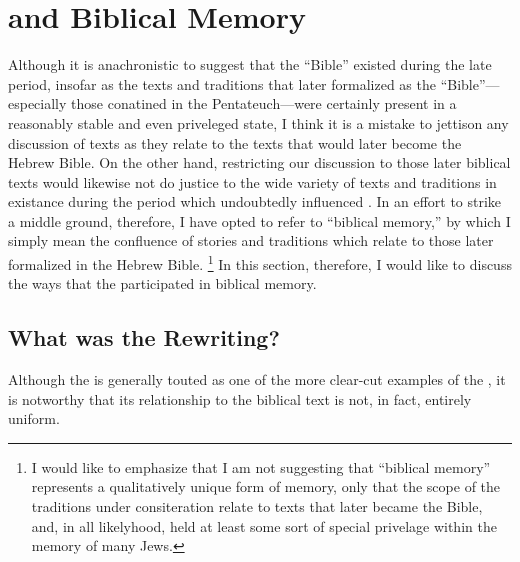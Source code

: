 




\section{\ga and Biblical Memory}

Although it is anachronistic to suggest that the ``Bible''  existed during the late \secondtemple period, insofar as the texts and traditions that later formalized as the ``Bible''---especially those conatined in the Pentateuch---were certainly present in a reasonably stable and even priveleged state, I think it is a mistake to jettison any discussion of \rwb texts as they relate to the texts that would later become the Hebrew Bible. On the other hand, restricting our discussion to those later biblical texts would likewise not do justice to the wide variety of texts and traditions in existance during the \secondtemple period which undoubtedly influenced \ga. In an effort to strike a middle ground, therefore, I have opted to refer to ``biblical memory,'' by which I simply mean the confluence of stories and traditions which relate to those later formalized in the Hebrew Bible.%
%
\footnote{I would like to emphasize that I am not suggesting that ``biblical memory'' represents a qualitatively unique form of memory, only that the scope of the traditions under consiteration relate to texts that later became the Bible, and, in all likelyhood, held at least some sort of special privelage within the memory of many \secondtemple Jews.}
%
In this section, therefore, I would like to discuss the ways that the \ga participated in biblical memory.

\subsection{What was the \ga Rewriting?}

Although the \ga is generally touted as one of the more clear-cut examples of the \rwb, it is notworthy that its relationship to the biblical text is not, in fact, entirely uniform.

